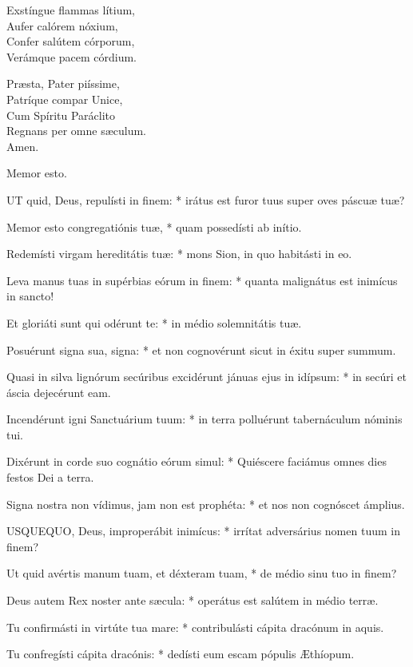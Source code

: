 Exstíngue flammas lítium,\\
Aufer calórem nóxium,\\
Confer salútem córporum,\\
Verámque pacem córdium.

Præsta, Pater piíssime,\\
Patríque compar Unice,\\
Cum Spíritu Paráclito\\
Regnans per omne sæculum.\\
Amen.

 Memor esto.


\lettrine[lines=2]{U}{T} quid, Deus, repulísti in finem: * irátus est furor tuus super oves páscuæ tuæ?

Memor esto congregatiónis tuæ, * quam possedísti ab inítio.

Redemísti virgam hereditátis tuæ: * mons Sion, in quo habitásti in eo.

Leva manus tuas in supérbias eórum in finem: * quanta malignátus est inimícus in sancto!

Et gloriáti sunt qui odérunt te: * in médio solemnitátis tuæ.

Posuérunt signa sua, signa: * et non cognovérunt sicut in éxitu super summum.

Quasi in silva lignórum secúribus excidérunt jánuas ejus in idípsum: * in secúri et áscia dejecérunt eam.

Incendérunt igni Sanctuárium tuum: * in terra polluérunt tabernáculum nóminis tui.

Dixérunt in corde suo cognátio eórum simul: * Quiéscere faciámus omnes dies festos Dei a terra.

Signa nostra non vídimus, jam non est prophéta: * et nos non cognóscet ámplius.


\lettrine[lines=2]{U}{SQUEQUO}, Deus, improperábit inimícus: * irrítat adversárius nomen tuum in finem?

Ut quid avértis manum tuam, et déxteram tuam, * de médio sinu tuo in finem?

Deus autem Rex noster ante sæcula: * operátus est salútem in médio terræ.

Tu confirmásti in virtúte tua mare: * contribulásti cápita dracónum in aquis.

Tu confregísti cápita dracónis: * dedísti eum escam pópulis Æthíopum.

